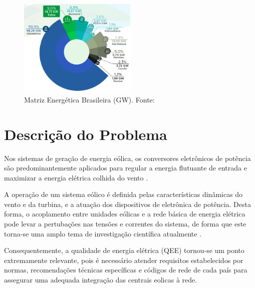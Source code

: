 
\begin{figure}[!hbt]
	\begin{center}
    \includegraphics[width=0.5\textwidth]{figuras/matriz_eletrica_brasileira.png}
    \caption{Matriz Energética Brasileira (GW). Fonte: \cite{ABEeolica}}
    \label{fig:matriz-energetica-brasileira}
    \end{center}
\end{figure}

\section{Descrição do Problema}


Nos sistemas de geração de energia eólica, os conversores eletrônicos de potência são predominantemente aplicados para regular a energia flutuante de entrada e maximizar a energia elétrica colhida do vento \cite{Ellabban2014}.

A operação de um sistema eólico é definida pelas características dinâmicas do vento e da turbina, e a atuação dos dispositivos de eletrônica de potência.
Desta forma, o acoplamento entre unidades eólicas e a rede básica de energia elétrica pode levar a pertubações nas tensões e correntes do sistema, de forma que este torna-se uma amplo tema de investigação científica atualmente \cite{TeseProfAlex}.

Consequentemente, a qualidade de energia elétrica (QEE) tornou-se um ponto extremamente relevante, pois é necessário atender requisitos estabelecidos por normas, recomendações técnicas específicas e códigos de rede de cada país para assegurar uma adequada integração das centrais eolicas à rede.

